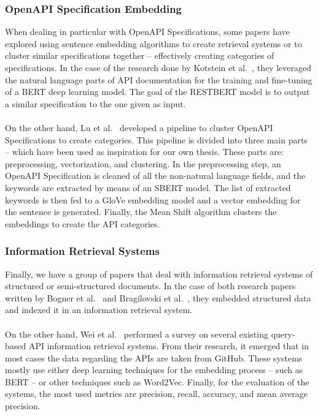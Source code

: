\subsubsection{OpenAPI Specification Embedding}
When dealing in particular with OpenAPI Specifications, some papers have explored using sentence embedding algorithms to create retrieval systems or to cluster similar specifications together -- effectively creating categories of specifications.
In the case of the research done by Kotstein et al.~\cite{kotstein_restberta_2024}, they leveraged the natural language parts of API documentation for the training and fine-tuning of a BERT deep learning model.
The goal of the RESTBERT model is to output a similar specification to the one given as input. \\ \\
On the other hand, Lu et al.~\cite{lu_comparing_2024} developed a pipeline to cluster OpenAPI Specifications to create categories.
This pipeline is divided into three main parts -- which have been used as inspiration for our own thesis.
These parts are: preprocessing, vectorization, and clustering.
In the preprocessing step, an OpenAPI Specification is cleaned of all the non-natural language fields, and the keywords are extracted by means of an SBERT model.
The list of extracted keywords is then fed to a GloVe embedding model and a vector embedding for the sentence is generated.
Finally, the Mean Shift algorithm clusters the embeddings to create the API categories.

\subsubsection{Information Retrieval Systems}
Finally, we have a group of papers that deal with information retrieval systems of structured or semi-structured documents.
In the case of both research papers written by Bogner et al.~\cite{bogner_evolvability_2020} and Bragilovski et al.~\cite{bragilovski_how_2024}, they embedded structured data and indexed it in an information retrieval system. \\ \\
On the other hand, Wei et al.~\cite{wei_survey_2023} performed a survey on several existing query-based API information retrieval systems.
From their research, it emerged that in most cases the data regarding the APIs are taken from GitHub.
These systems mostly use either deep learning techniques for the embedding process -- such as BERT -- or other techniques such as Word2Vec.
Finally, for the evaluation of the systems, the most used metrics are precision, recall, accuracy, and mean average precision.
